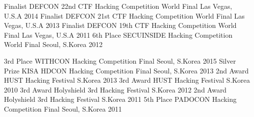 \begin{cvhonors}
  \cvhonor
    {Finalist}
    {DEFCON 22nd CTF Hacking Competition World Final}
    {Las Vegas, U.S.A}
    {2014}
  \cvhonor
    {Finalist}
    {DEFCON 21st CTF Hacking Competition World Final}
    {Las Vegas, U.S.A}
    {2013}
  \cvhonor
    {Finalist}
    {DEFCON 19th CTF Hacking Competition World Final}
    {Las Vegas, U.S.A}
    {2011}
  \cvhonor
    {6th Place}
    {SECUINSIDE Hacking Competition World Final}
    {Seoul, S.Korea}
    {2012}
\end{cvhonors}

\begin{cvhonors}
  \cvhonor
    {3rd Place}
    {WITHCON Hacking Competition Final}
    {Seoul, S.Korea}
    {2015}
  \cvhonor
    {Silver Prize}
    {KISA HDCON Hacking Competition Final}
    {Seoul, S.Korea}
    {2013}
  \cvhonor
    {2nd Award}
    {HUST Hacking Festival}
    {S.Korea}
    {2013}
  \cvhonor
    {3rd Award}
    {HUST Hacking Festival}
    {S.Korea}
    {2010}
  \cvhonor
    {3rd Award}
    {Holyshield 3rd Hacking Festival}
    {S.Korea}
    {2012}
  \cvhonor
    {2nd Award}
    {Holyshield 3rd Hacking Festival}
    {S.Korea}
    {2011}
  \cvhonor
    {5th Place}
    {PADOCON Hacking Competition Final}
    {Seoul, S.Korea}
    {2011}
\end{cvhonors}
